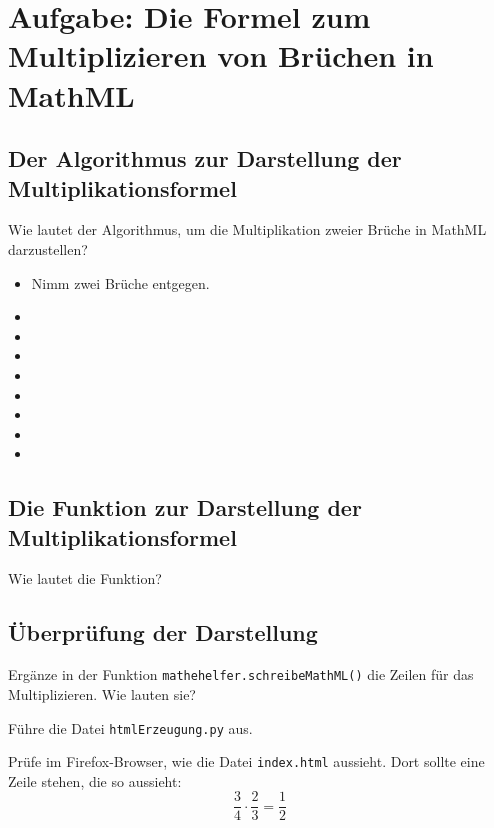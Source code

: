 \section{Aufgabe: Die Formel zum Multiplizieren von Brüchen in MathML}

\subsection*{Der Algorithmus zur Darstellung der Multiplikationsformel}

Wie lautet der Algorithmus, um die Multiplikation zweier Brüche in MathML darzustellen?

\begin{itemize}[itemsep=2ex]
	\item Nimm zwei Brüche entgegen.
	\item 
	\item 
	\item 
	\item 
	\item 
	\item 
	\item 
	\item 
\end{itemize}

\subsection*{Die Funktion zur Darstellung der Multiplikationsformel}

Wie lautet die Funktion?

\subsection*{Überprüfung der Darstellung}

Ergänze in der Funktion \texttt{mathehelfer.schreibeMathML()} die Zeilen für das Multiplizieren. Wie lauten sie?

Führe die Datei \texttt{htmlErzeugung.py} aus.

Prüfe im Firefox-Browser, wie die Datei \texttt{index.html} aussieht. Dort sollte eine Zeile stehen, die so aussieht:
\[
\frac{3}{4} \cdot \frac{2}{3} = \frac{1}{2}
\]